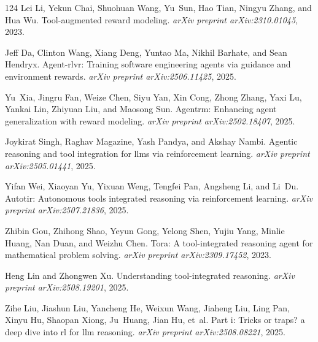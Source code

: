 \documentclass[]{youtu} %
\begin{document}
\begin{thebibliography}{124}
Lei Li, Yekun Chai, Shuohuan Wang, Yu~Sun, Hao Tian, Ningyu Zhang, and Hua Wu.
\newblock Tool-augmented reward modeling.
\newblock \emph{arXiv preprint arXiv:2310.01045}, 2023.

Jeff Da, Clinton Wang, Xiang Deng, Yuntao Ma, Nikhil Barhate, and Sean Hendryx.
\newblock Agent-rlvr: Training software engineering agents via guidance and environment rewards.
\newblock \emph{arXiv preprint arXiv:2506.11425}, 2025.

Yu~Xia, Jingru Fan, Weize Chen, Siyu Yan, Xin Cong, Zhong Zhang, Yaxi Lu, Yankai Lin, Zhiyuan Liu, and Maosong Sun.
\newblock Agentrm: Enhancing agent generalization with reward modeling.
\newblock \emph{arXiv preprint arXiv:2502.18407}, 2025.

Joykirat Singh, Raghav Magazine, Yash Pandya, and Akshay Nambi.
\newblock Agentic reasoning and tool integration for llms via reinforcement learning.
\newblock \emph{arXiv preprint arXiv:2505.01441}, 2025.

Yifan Wei, Xiaoyan Yu, Yixuan Weng, Tengfei Pan, Angsheng Li, and Li~Du.
\newblock Autotir: Autonomous tools integrated reasoning via reinforcement learning.
\newblock \emph{arXiv preprint arXiv:2507.21836}, 2025.

Zhibin Gou, Zhihong Shao, Yeyun Gong, Yelong Shen, Yujiu Yang, Minlie Huang, Nan Duan, and Weizhu Chen.
\newblock Tora: A tool-integrated reasoning agent for mathematical problem solving.
\newblock \emph{arXiv preprint arXiv:2309.17452}, 2023.

Heng Lin and Zhongwen Xu.
\newblock Understanding tool-integrated reasoning.
\newblock \emph{arXiv preprint arXiv:2508.19201}, 2025.

Zihe Liu, Jiashun Liu, Yancheng He, Weixun Wang, Jiaheng Liu, Ling Pan, Xinyu Hu, Shaopan Xiong, Ju~Huang, Jian Hu, et~al.
\newblock Part i: Tricks or traps? a deep dive into rl for llm reasoning.
\newblock \emph{arXiv preprint arXiv:2508.08221}, 2025{}.


\end{thebibliography}
\end{document}
